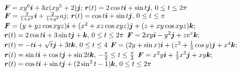 \(\kvec{F}=xy^6\ai+3x(xy^5+2)\aj;\, \kvec{r}(t)=2\cos t\ai+\sin t\aj,\, 0\le t\le 2\pi\)
\(\kvec{F}=\tfrac{3}{1+x^2}\ai+\tfrac{2}{1+y^2}aj;\, \kvec{r}(t)=\cos t\ai+\sin t\aj,\, 0\le t\le \pi\)
\(\kvec{F}=(y+yz\cos xyz)\ai+(x^2+xz\cos xyz)\aj+(z+xy\cos xyz)\ak;\)\\
\( \kvec{r}(t)=2\cos t\ai+3\sin t\aj+\ak,\, 0\le t\le 2\pi\)
\(\kvec{F}=2xy\ai-y^2\aj+ze^x\ak;\)\\
\( \kvec{r}(t)=-t\ai+\sqrt{t}\aj+3t\ak,\, 0\le t\le 4\)
\(\kvec{F}=(2y+\sin x)\ai+(z^2+\tfrac{1}{3}\cos y)\aj+x^4\ak;\)\\
\( \kvec{r}(t)=\sin t \ai+\cos t\aj+\sin 2t\ak,\, -\tfrac{\pi}{2}\le t\le \tfrac{\pi}{2}\)
\(\kvec{F}=x^2y\ai+\tfrac{1}{3}x^3\aj+xy\ak;\)\\
\( \kvec{r}(t)=\cos t\ai+\sin t\aj+(2\sin^2 t-1)\ak,\, 0\le t\le 2\pi\)

